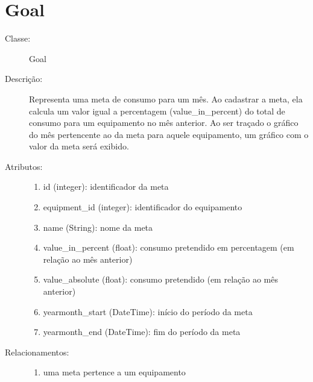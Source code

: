 \section{Goal}
\begin{description}
  \item[Classe:] Goal
  \item[Descrição:] Representa uma meta de consumo para um mês. Ao cadastrar a meta, ela calcula um valor igual a percentagem (value\_in\_percent) do total de consumo para um equipamento no mês anterior. Ao ser traçado o gráfico do mês pertencente ao da meta para aquele equipamento, um gráfico com o valor da meta será exibido.
  \item[Atributos:] \hfill
    \begin{enumerate}
      \item id (integer): identificador da meta
      \item equipment\_id (integer): identificador do equipamento
      \item name (String):  nome da meta
      \item value\_in\_percent (float): consumo pretendido em percentagem (em relação ao mês anterior)
      \item value\_absolute (float): consumo pretendido (em relação ao mês anterior)
      \item yearmonth\_start (DateTime): início do período da meta
        \item yearmonth\_end (DateTime): fim do período da meta
    \end{enumerate}
  \item[Relacionamentos:] \hfill
    \begin{enumerate}
      \item uma meta pertence a um equipamento
    \end{enumerate}
\end{description} 
%
